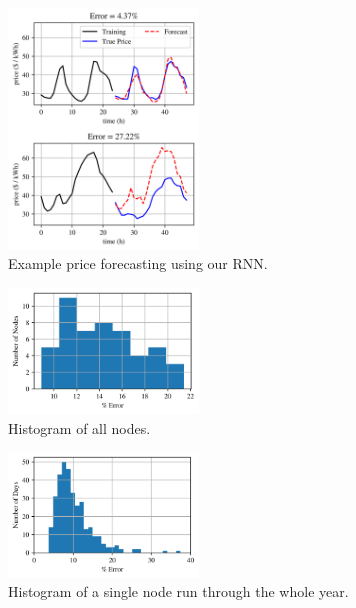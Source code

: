 \documentclass[sigconf]{acmart}
\begin{document}
\begin{figure}[h]
\includegraphics[width=0.45\textwidth]{fig_3.png}
\caption{Example price forecasting using our RNN.}
\label{fig:ex_prices}
\end{figure}

\begin{figure}[h]
\includegraphics[width=0.45\textwidth]{fig_5.png}
\caption{Histogram of all nodes.}
\label{fig:hist_small}
\end{figure}



\begin{figure}[h]
\includegraphics[width=0.45\textwidth]{fig_7.png}
\caption{Histogram of a single node run through the whole year.}
\label{fig:hist_single}
\end{figure}
\end{document}
